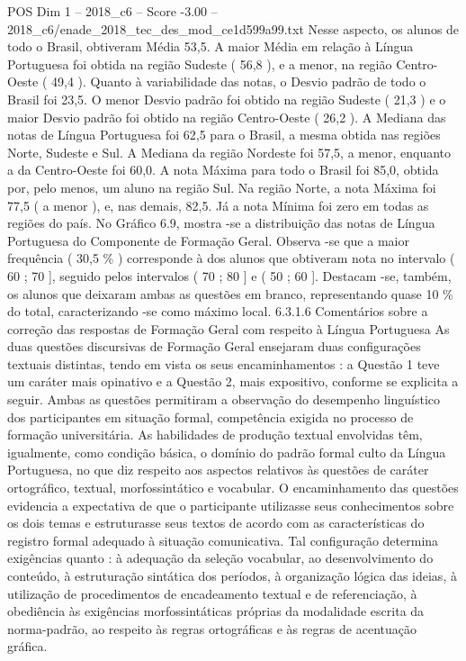 \begin{textsample}{POS Dim 1 – 2018\_c6 – Score -3.00 – 2018\_c6/enade\_2018\_tec\_des\_mod\_ce1d599a99.txt}
Nesse aspecto, os alunos de todo o Brasil, obtiveram Média 53,5.
A maior Média em relação à Língua Portuguesa foi obtida na região Sudeste ( 56,8 ), e a menor, na região Centro-Oeste ( 49,4 ).
Quanto à variabilidade das notas, o Desvio padrão de todo o Brasil foi 23,5.
O menor Desvio padrão foi obtido na região Sudeste ( 21,3 ) e o maior Desvio padrão foi obtido na região Centro-Oeste ( 26,2 ).
A Mediana das notas de Língua Portuguesa foi 62,5 para o Brasil, a mesma obtida nas regiões Norte, Sudeste e Sul.
A Mediana da região Nordeste foi 57,5, a menor, enquanto a da Centro-Oeste foi 60,0.
A nota Máxima para todo o Brasil foi 85,0, obtida por, pelo menos, um aluno na região Sul.
Na região Norte, a nota Máxima foi 77,5 ( a menor ), e, nas demais, 82,5.
Já a nota Mínima foi zero em todas as regiões do país.
No Gráfico 6.9, mostra -se a distribuição das notas de Língua Portuguesa do Componente de Formação Geral.
Observa -se que a maior frequência ( 30,5 \% ) corresponde à dos alunos que obtiveram nota no intervalo ( 60 ; 70 ], seguido pelos intervalos ( 70 ; 80 ] e ( 50 ; 60 ].
Destacam -se, também, os alunos que deixaram ambas as questões em branco, representando quase 10 \% do total, caracterizando -se como máximo local. 6.3.1.6 Comentários sobre a correção das respostas de Formação Geral com respeito à Língua Portuguesa As duas questões discursivas de Formação Geral ensejaram duas configurações textuais distintas, tendo em vista os seus encaminhamentos : a Questão 1 teve um caráter mais opinativo e a Questão 2, mais expositivo, conforme se explicita a seguir.
Ambas as questões permitiram a observação do desempenho linguístico dos participantes em situação formal, competência exigida no processo de formação universitária.
As habilidades de produção textual envolvidas têm, igualmente, como condição básica, o domínio do padrão formal culto da Língua Portuguesa, no que diz respeito aos aspectos relativos às questões de caráter ortográfico, textual, morfossintático e vocabular.
O encaminhamento das questões evidencia a expectativa de que o participante utilizasse seus conhecimentos sobre os dois temas e estruturasse seus textos de acordo com as características do registro formal adequado à situação comunicativa.
Tal configuração determina exigências quanto : à adequação da seleção vocabular, ao desenvolvimento do conteúdo, à estruturação sintática dos períodos, à organização lógica das ideias, à utilização de procedimentos de encadeamento textual e de referenciação, à obediência às exigências morfossintáticas próprias da modalidade escrita da norma-padrão, ao respeito às regras ortográficas e às regras de acentuação gráfica.

\end{textsample}
